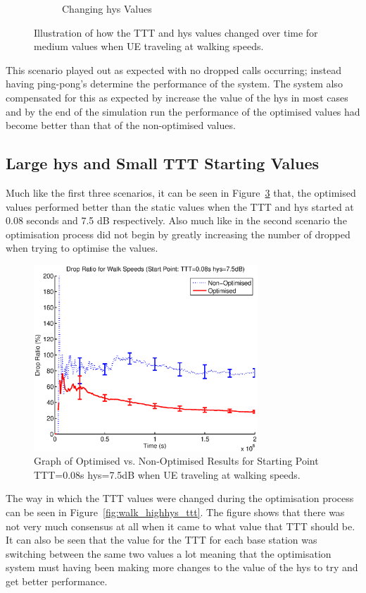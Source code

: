 \begin{figure}[H]
\begin{subfigure}[b]{0.49\textwidth}
                \caption{Changing hys Values}
                \label{fig:walk_low_hys}
        \end{subfigure}
        \caption{Illustration of how the TTT and hys values changed over time for medium values when UE traveling at walking speeds.}\label{fig:walk_low_ttthys}
\end{figure}
This scenario played out as expected with no dropped calls occurring; instead having ping-pong’s determine the performance of the system. The system also compensated for this as expected by increase the value of the hys in most cases and by the end of the simulation run the performance of the optimised values had become better than that of the non-optimised values.
\subsection{Large hys and Small TTT Starting Values}
Much like the first three scenarios, it can be seen in Figure~\ref{fig:walk_highhys_drop} that, the optimised values performed better than the static values when the TTT and hys started at 0.08 seconds and 7.5 dB respectively. Also much like in the second scenario the optimisation process did not begin by greatly increasing the number of dropped when trying to optimise the values.
\begin{figure}[H]
  \begin{center}
    	  \includegraphics[width=0.75\textwidth]{figures/walking_figures/walkhighhys.eps}
    \end{center}
    \caption{Graph of Optimised vs. Non-Optimised Results for Starting Point TTT=0.08s hys=7.5dB when UE traveling at walking speeds.}
    \label{fig:walk_highhys_drop}
\end{figure}
The way in which the TTT values were changed during the optimisation process can be seen in Figure~\ref{fig:walk_highhys_ttt}. The figure shows that there was not very much consensus at all when it came to what value that TTT should be. It can also be seen that the value for the TTT for each base station was switching between the same two values a lot meaning that the optimisation system must having been making more changes to the value of the hys to try and get better performance.

